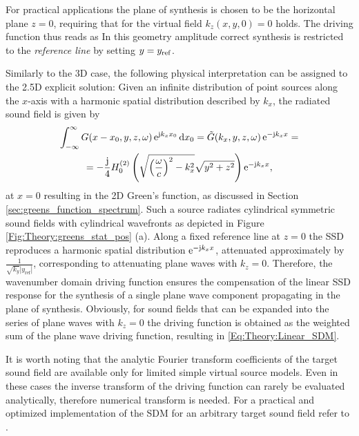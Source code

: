 For practical applications the plane of synthesis is chosen to be the horizontal plane $z=0$, requiring that for the virtual field $k_z(x,y,0) = 0$ holds.
The driving function thus reads as
In this geometry amplitude correct synthesis is restricted to the \emph{reference line} by setting $y = y_{\mathrm{ref}}$.

Similarly to the 3D case, the following physical interpretation can be assigned to the 2.5D explicit solution:
Given an infinite distribution of point sources along the $x$-axis with a harmonic spatial distribution described by $k_x$, the radiated sound field is given by
\begin{multline}
\int_{-\infty}^{\infty} G(x - x_0,y,z,\omega) \, \mathrm{e}^{\mathrm{j} k_x x_0} \, \mathrm{d} x_0 = \tilde{G}(k_x,y,z,\omega) \, \mathrm{e}^{-\mathrm{j} k_x x} = \\
=  -\frac{\mathrm{j}}{4} H_0^{(2)}\left( \sqrt{\left( \frac{\omega}{c} \right)^2-k_x^2} \sqrt{y^2+z^2} \right)  \mathrm{e}^{-\mathrm{j} k_x x},
\end{multline}
at $x=0$ resulting in the 2D Green's function, as discussed in Section \ref{sec:greens_function_spectrum}.
Such a source radiates cylindrical symmetric sound fields with cylindrical wavefronts as depicted in Figure \eqref{Fig:Theory:greens_stat_pos} (a). 
Along a fixed reference line at $z=0$ the SSD reproduces a harmonic spatial distribution $\mathrm{e}^{-\mathrm{j} k_x x}$, attenuated approximately by $\frac{1}{\sqrt{k_y}|y_{\mathrm{ref}}|}$, corresponding to attenuating plane waves with $k_z=0$.
Therefore, the wavenumber domain driving function ensures the compensation of the linear SSD response for the synthesis of a single plane wave component propagating in the plane of synthesis.
Obviously, for sound fields that can be expanded into the series of plane waves with $k_z=0$ the driving function is obtained as the weighted sum of the plane wave driving function, resulting in \eqref{Eq:Theory:Linear_SDM}.

It is worth noting that the analytic Fourier transform coefficients of the target sound field are available only for limited simple virtual source models. 
Even in these cases the inverse transform of the driving function can rarely be evaluated analytically, therefore numerical transform is needed.
For a practical and optimized implementation of the SDM for an arbitrary target sound field refer to \cite{ahrens2013a:efficientSDM}.

